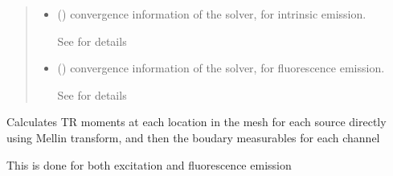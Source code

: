 \documentclass[letterpaper,10pt,english]{sphinxmanual}
\begin{document}
\begin{fulllineitems}
\begin{fulllineitems}
\begin{quote}
\begin{description}
\begin{itemize}
\item {} 
\sphinxAtStartPar
{} () \textendash{} convergence information of the solver, for intrinsic emission.

\sphinxAtStartPar
See {\hyperref[\detokenize{_autosummary/nirfasterff.utils.ConvergenceInfo:nirfasterff.utils.ConvergenceInfo}]{}} for details

\item {} 
\sphinxAtStartPar
{} () \textendash{} convergence information of the solver, for fluorescence emission.

\sphinxAtStartPar
See {\hyperref[\detokenize{_autosummary/nirfasterff.utils.ConvergenceInfo:nirfasterff.utils.ConvergenceInfo}]{}} for details

\end{itemize}


\end{description}\end{quote}

\end{fulllineitems}


\begin{fulllineitems}
\label{\detokenize{_autosummary/nirfasterff.base.fluor_mesh.fluormesh:nirfasterff.base.fluor_mesh.fluormesh.femdata_moments}}
\pysigstartsignatures
\pysiglinewithargsret
{}
{\sphinxparamcomma {}\sphinxparamcomma {}\sphinxparamcomma {}}
{}
\pysigstopsignatures
\sphinxAtStartPar
Calculates TR moments at each location in the mesh for each source directly using Mellin transform, and then the boudary measurables for each channel

\sphinxAtStartPar
This is done for both excitation and fluorescence emission


\end{fulllineitems}
\end{fulllineitems}
\end{document}
